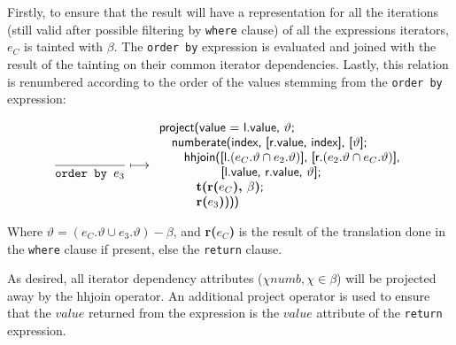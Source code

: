 Firstly, to ensure that the result will have a representation for all the iterations (still valid after possible
filtering by \texttt{where} clause) of all the expressions iterators, $e_C$ is tainted with $\beta$. The
\texttt{order by} expression is evaluated and joined with the result of the tainting on their common iterator
dependencies. Lastly, this relation is renumbered according to the order of the values stemming from the
\texttt{order by} expression:

\begin{equation}
\frac{}{\mbox{\texttt{order by }}e_3}\longmapsto
\begin{array}{l}
\mbox{\textsf{project(value = l.value, }}\vartheta\mbox{\textsf{;}}\\ \quad
\mbox{\textsf{numberate(index, [r.value, index], [}}\vartheta\mbox{\textsf{];}} \\ \quad \quad
\mbox{\textsf{hhjoin([l.}}(e_{C}.\vartheta \cap e_2.\vartheta)\mbox{\textsf{], [r.}}(e_{2}.\vartheta \cap
e_{C}.\vartheta)\mbox{\textsf{],}} 
\\ \quad \quad \quad \quad \quad\mbox{\textsf{[l.value, r.value, }} \vartheta\mbox{\textsf{];}} \\ \quad \quad
\quad \mbox{\textbf{t(r(}}e_C\mbox{\textbf{), }}\beta\mbox{\textbf{)}\textsf{;}} \\ \quad \quad \quad
\mbox{\textbf{r(}}e_3\mbox{\textbf{)}\textsf{)))}}
\end{array}
\end{equation}

Where $\vartheta = (e_C.\vartheta \cup e_3.\vartheta)-\beta$, and \textbf{r(}$e_{C}$\textbf{)} is the result of
the translation done in the \texttt{where} clause if present, else the \texttt{return} clause.

As desired, all iterator dependency attributes ($\chi{numb}, \chi \in \beta$) will be projected away by the
\textsf{hhjoin} operator. An additional \textsf{project} operator is used to ensure that the $value$ returned from
the expression is the $value$ attribute of the \texttt{return} expression.

